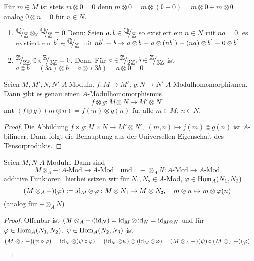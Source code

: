 \begin{anm}
	Für $m \in M $ ist stets $m \otimes 0 =0 $ denn  $ m \otimes 0 = m \otimes (0+0) = m \otimes 0 + m \otimes 0 $ analog $ 0 \otimes n = 0 $ für $n \in N$. 
\end{anm}
\begin{bsp}
	\begin{enumerate}
		\item $\QR{\Q}{\Z} \otimes_{\Z} \QR{\Q}{\Z} = 0 $ Denn: Seien $a,b \in \QR{\Q}{\Z}$ so existiert ein $ n \in N $ mit $ na = 0 $, es existiert ein $b^{'} \in \QR{\Q}{\Z} $ mit $nb^{'} = b \Rightarrow a \otimes b = a \otimes (nb^{'}) = (na) \otimes b^{'} = 0 \otimes b^{'}$
		\item $\QR{\Z}{2\Z} \otimes_{\Z} \QR{\Z}{3\Z} = 0 $. Denn: Für $a \in \QR{\Z}{2\Z}, b \in \QR{\Z}{3\Z} $ ist $a \otimes b = (3a) \otimes b = a \otimes (3b) = a \otimes 0 = 0$
	\end{enumerate}
\end{bsp}
\begin{bem}\label{13.5}
	Seien $M,M', N,N'$ $A$-Moduln, $f:M \to M'$, $g:N \to N'$ $A$-Modulhomomorphismen. Dann gibt es genau einen $A$-Modulhomomorphismus 
	$$f\otimes g: M \otimes N \longrightarrow M' \otimes N'$$
	mit $(f \otimes g)(m \otimes n) = f(m) \otimes g(n)$ für alle $m\in M, \, n\in N$.
\end{bem}
\begin{proof}
	Die Abbildung $f\times g:M \times N \to M' \otimes N', \; (m,n) \mapsto f(m) \otimes g(n)$ ist $A$-bilinear. Dann folgt die Behauptung aus der Universellen Eigenschaft des Tensorprodukts.
\end{proof}
\begin{fo}
	Seien $M,N$ $A$-Moduln. Dann sind 
	$$M \otimes_A - : A\text{-Mod} \to A\text{-Mod} \quad \text{und} \quad -\otimes_A N: A\text{-Mod} \to A\text{-Mod}$$
	additive Funktoren. hierbei setzen wir für $N_1, N_2\in A$-Mod, $\varphi \in \operatorname{Hom}_A(N_1, N_2)$
	$$(M \otimes_A -)(\varphi) : =\operatorname{id}_M\otimes\, \varphi : M \otimes N_1 \to M \otimes N_2, \quad m\otimes n \mapsto m \otimes \varphi(n)$$
	(analog für $-\otimes_A N$)
\end{fo}\label{13.6}
\begin{proof}
	Offenbar ist $(M \otimes_A -)(\operatorname{id}_N) = \operatorname{id}_M\otimes \operatorname{id}_N = \operatorname{id}_{M \otimes N}$ und für $\varphi \in \operatorname{Hom}_A(N_1, N_2)$, $\psi \in \operatorname{Hom}_A(N_2,N_3)$ ist 
	$$(M \otimes_A -)(\psi\circ \varphi) = \operatorname{id}_M \otimes(\psi \circ \varphi) = (\operatorname{id}_M \otimes \psi)\otimes(\operatorname{id}_M\otimes \varphi) = (M \otimes_A-)(\psi) \circ (M \otimes_A -)(\varphi)$$
\end{proof}
